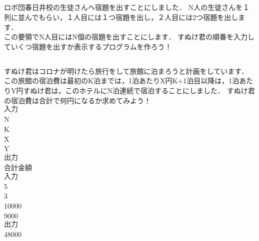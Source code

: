 \documentclass[dvipdfmx]{jsarticle}
\begin{document}
\subsection{}
ロボ団春日井校の生徒さんへ宿題を出すことにしました．
N人の生徒さんを１列に並んでもらい，１人目には１つ宿題を出し，２人目には2つ宿題を出します．\\
この要領でN人目にはN個の宿題を出すことにします．
すぬけ君の順番を入力していくつ宿題を出すか表示するプログラムを作ろう！\\
\subsection{}
すぬけ君はコロナが明けたら旅行をして旅館に泊まろうと計画をしています．\\
この旅館の宿泊費は最初のK泊までは，1泊あたりX円K+1泊目以降は，1泊あたりY円すぬけ君は，このホテルにN泊連続で宿泊することにしました．
すぬけ君の宿泊費は合計で何円になるか求めてみよう！\\
$\underline{入力}$\\
N\\
K\\
X\\
Y\\
$\underline{出力}$\\
合計金額\\
$\underline{入力}$\\
5\\
3\\
10000\\
9000\\
$\underline{出力}$\\
48000\\
\end{document}
